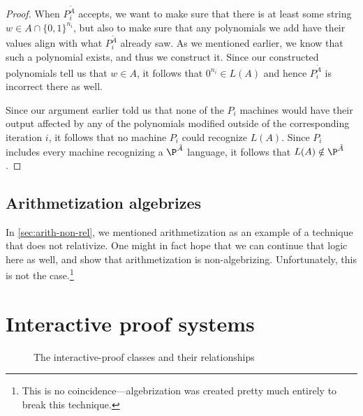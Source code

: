 \documentclass[english,12pt]{reedthesis}
\theoremstyle{plain}
\theoremstyle{definition}
\theoremstyle{remark}
\begin{document}
\begin{proof}
  When $P_{i}^{\tilde{A}}$ accepts, we want to make sure that there is at least
  some string $w \in A \cap \{0, 1\}^{n_{i}}$, but also to make sure that any
  polynomials we add have their values align with what $P_{i}^{\tilde{A}}$
  already saw. As we mentioned earlier, we know that such a polynomial exists,
  and thus we construct it. Since our constructed polynomials tell us that
  $w \in A$, it follows that $0^{n_{i}} \in L(A)$ and hence $P_{i}^{\tilde{A}}$ is
  incorrect there as well.

  Since our argument earlier told us that none of the $P_{i}$ machines would
  have their output affected by any of the polynomials modified outside of the
  corresponding iteration $i$, it follows that no machine $P_{i}$ could
  recognize $L(A)$. Since $P_{i}$ includes every machine recognizing a
  $\P^{\tilde{A}}$ language, it follows that $L(A) \notin \P^{\tilde{A}}$.
\end{proof}

\section{Arithmetization algebrizes}\label{sec:arith-algebrizes}

In \cref{sec:arith-non-rel}, we mentioned arithmetization as an example of a
technique that does not relativize. One might in fact hope that we can continue
that logic here as well, and show that arithmetization is non-algebrizing.
Unfortunately, this is not the case.\footnote{This is no
  coincidence---algebrization was created pretty much entirely to break this
  technique.}

\chapter{Interactive proof systems}\label{chap:ips}

\begin{figure}[htbp]
  \centering
  \caption{The interactive-proof classes and their
    relationships}\label{fig:ip-class-venn}
\end{figure}
\end{document}
